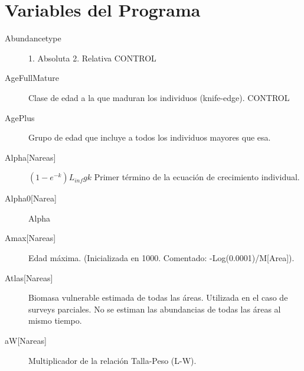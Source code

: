 \documentclass[12pt, oneside, a4paper]{article}
\begin{document}
	\section{Variables del Programa}		

		
		\begin{description}
		
		\item[Abundancetype] 1. Absoluta 2. Relativa CONTROL
		\item[AgeFullMature] Clase de edad a la que maduran los individuos (knife-edge). CONTROL
		\item[AgePlus] Grupo de edad que incluye a todos los individuos mayores que esa.
		\item[Alpha{[}Nareas{]}] $(1-e^{-k}) L_{inf} gk$ Primer término de la ecuación de crecimiento individual.
		\item[Alpha0{[}Narea{]}] Alpha
		\item[Amax{[}Nareas{]}] Edad máxima. (Inicializada en 1000. Comentado: -Log(0.0001)/M[Area]).
		\item[Atlas{[}Nareas{]}] Biomasa vulnerable estimada de todas las áreas. Utilizada en el caso de surveys parciales. No se estiman las abundancias de todas las áreas al mismo tiempo. 
		\item[aW{[}Nareas{]}] Multiplicador de la relación Talla-Peso (L-W).
		

\end{description}
\end{document}
